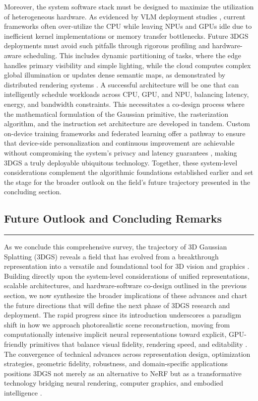 \documentclass[11pt]{article}
\begin{document}
Moreover, the system software stack must be designed to maximize the utilization of heterogeneous hardware. As evidenced by VLM deployment studies \cite{ref786}, current frameworks often over-utilize the CPU while leaving NPUs and GPUs idle due to inefficient kernel implementations or memory transfer bottlenecks. Future 3DGS deployments must avoid such pitfalls through rigorous profiling and hardware-aware scheduling. This includes dynamic partitioning of tasks, where the edge handles primary visibility and simple lighting, while the cloud computes complex global illumination or updates dense semantic maps, as demonstrated by distributed rendering systems \cite{ref787}. A successful architecture will be one that can intelligently schedule workloads across CPU, GPU, and NPU, balancing latency, energy, and bandwidth constraints. This necessitates a co-design process where the mathematical formulation of the Gaussian primitive, the rasterization algorithm, and the instruction set architecture are developed in tandem. Custom on-device training frameworks and federated learning offer a pathway to ensure that device-side personalization and continuous improvement are achievable without compromising the system's privacy and latency guarantees \cite{ref785}, making 3DGS a truly deployable ubiquitous technology. Together, these system-level considerations complement the algorithmic foundations established earlier and set the stage for the broader outlook on the field's future trajectory presented in the concluding section.

\subsection{Future Outlook and Concluding Remarks}

\begin{center}\rule{0.5\linewidth}{0.5pt}\end{center}

As we conclude this comprehensive survey, the trajectory of 3D Gaussian Splatting (3DGS) reveals a field that has evolved from a breakthrough representation into a versatile and foundational tool for 3D vision and graphics \cite{ref5}. Building directly upon the system-level considerations of unified representations, scalable architectures, and hardware-software co-design outlined in the previous section, we now synthesize the broader implications of these advances and chart the future directions that will define the next phase of 3DGS research and deployment. The rapid progress since its introduction underscores a paradigm shift in how we approach photorealistic scene reconstruction, moving from computationally intensive implicit neural representations toward explicit, GPU-friendly primitives that balance visual fidelity, rendering speed, and editability \cite{ref37}. The convergence of technical advances across representation design, optimization strategies, geometric fidelity, robustness, and domain-specific applications positions 3DGS not merely as an alternative to NeRF but as a transformative technology bridging neural rendering, computer graphics, and embodied intelligence \cite{ref4}.
\end{document}
